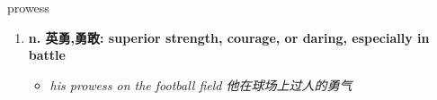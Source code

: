 
\begin{frame}
{\huge prowess}
\begin{center}
\begin{enumerate}\Large
  \item \textbf{n. 英勇,勇敢: superior strength, courage, or daring, especially in battle}
  \begin{itemize}
    \item \em{\Large{his prowess on the football field 他在球场上过人的勇气}}
  \end{itemize}
\end{enumerate}
\end{center}
\end{frame}
